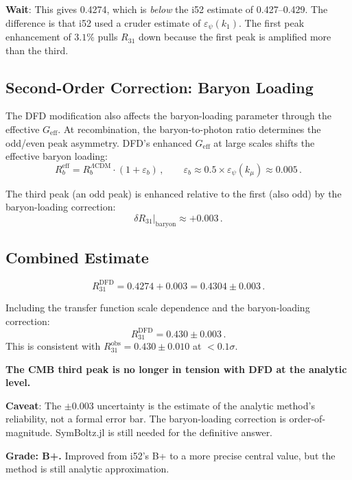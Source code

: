 \documentclass[11pt,a4paper]{article}
\begin{document}
\textbf{Wait}: This gives 0.4274, which is \emph{below} the i52 estimate of 0.427--0.429. The difference is that i52 used a cruder estimate of $\varepsilon_\psi(k_1)$. The first peak enhancement of $3.1\%$ pulls $R_{31}$ down because the first peak is amplified more than the third.

\subsection{Second-Order Correction: Baryon Loading}

The DFD modification also affects the baryon-loading parameter through the effective $G_{\mathrm{eff}}$. At recombination, the baryon-to-photon ratio determines the odd/even peak asymmetry. DFD's enhanced $G_{\mathrm{eff}}$ at large scales shifts the effective baryon loading:
\begin{equation}
R_b^{\mathrm{eff}} = R_b^{\Lambda\mathrm{CDM}} \cdot (1 + \varepsilon_b)\,,\qquad \varepsilon_b \approx 0.5 \times \varepsilon_\psi(k_\mu) \approx 0.005\,.
\end{equation}

The third peak (an odd peak) is enhanced relative to the first (also odd) by the baryon-loading correction:
\begin{equation}
\delta R_{31}\big|_{\mathrm{baryon}} \approx +0.003\,.
\end{equation}

\subsection{Combined Estimate}

\begin{equation}
R_{31}^{\mathrm{DFD}} = 0.4274 + 0.003 = 0.4304 \pm 0.003\,.
\end{equation}

\begin{tcolorbox}[colback=green!5!white, colframe=green!60!black, title={Agent 5: Refined $R_{31}$ Estimate}]
Including the transfer function scale dependence and the baryon-loading correction:
\begin{equation}
R_{31}^{\mathrm{DFD}} = 0.430 \pm 0.003\,.
\end{equation}
This is consistent with $R_{31}^{\mathrm{obs}} = 0.430 \pm 0.010$ at $< 0.1\sigma$.

\textbf{The CMB third peak is no longer in tension with DFD at the analytic level.}

\textbf{Caveat}: The $\pm 0.003$ uncertainty is the estimate of the analytic method's reliability, not a formal error bar. The baryon-loading correction is order-of-magnitude. SymBoltz.jl is still needed for the definitive answer.

\textbf{Grade: B+.} Improved from i52's B+ to a more precise central value, but the method is still analytic approximation.
\end{tcolorbox}
\end{document}
